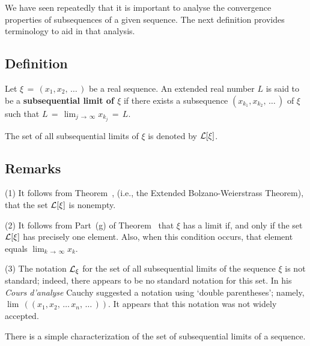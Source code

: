 {\V
\V

        We have seen repeatedly that it is important to analyse the convergence properties of subsequences of a given sequence.
    The next definition provides terminology to aid in that analysis.

            \subsection{\small{\bf Definition}}
            \label{DefC50.80}

        Let ${\xi} \,=\, (x_{1},x_{2},\,{\ldots}\,)$ be a real sequence. An extended real number $L$
    is said to be a {\bf subsequential limit of ${\xi}$} if there exists a subsequence $(x_{k_{1}},x_{k_{2}},\,{\ldots}\,)$ of ${\xi}$
    such that $L \,=\, \lim_{j \,{\rightarrow}\,{\infty}} x_{k_{j}} \,=\, L$.

        The set of all subsequential limits of ${\xi}$ is denoted by ${\cal L}[{\xi}]$.

\V

            \subsection{\small{\bf Remarks}}
            \label{RemrkC50.90}


        (1) It follows from Theorem~, (i.e., the Extended Bolzano-Weierstrass Theorem), that the set ${\cal L}[{\xi}]$ is nonempty.

\V

        (2) It follows from Part~(g) of Theorem~ that ${\xi}$ has a limit if, and only if the set ${\cal L}[{\xi}]$ has precisely one element.
    Also, when this condition occurs, that element equals $\lim_{k \,{\rightarrow}\, {\infty}} x_{k}$.

\V

        (3) The notation ${\cal L}_{{\xi}}$ for the set of all subsequential limits of the sequence ${\xi}$ is not standard;
    indeed, there appears to be no standard notation for this set. In his {\em Cours d'analyse} Cauchy suggested a notation using `double parentheses'; namely,
    $\lim\,((x_{1}, x_{2},\,{\ldots}\,x_{n},\,{\ldots}\,))$. It appears that this notation was not widely accepted.

\V

        There is a simple characterization of the set of subsequential limits of a sequence.

\V


}
